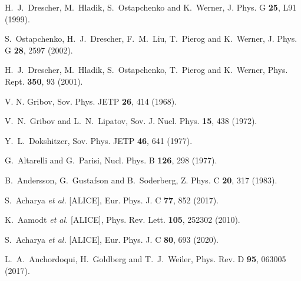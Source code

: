 \documentclass[aps,twocolumn,nofootinbib]{revtex4-1}
\begin{document}
\begin{thebibliography}{}
H.~J.~Drescher, M.~Hladik, S.~Ostapchenko and K.~Werner,
J. Phys. G \textbf{25}, L91 (1999).

S.~Ostapchenko, H.~J.~Drescher, F.~M.~Liu, T.~Pierog and K.~Werner,
J. Phys. G \textbf{28}, 2597 (2002).

H.~J.~Drescher, M.~Hladik, S.~Ostapchenko, T.~Pierog and K.~Werner,
Phys. Rept. \textbf{350}, 93 (2001).

V. N. Gribov, Sov. Phys. JETP \textbf{26}, 414 (1968).

V.~N.~Gribov and L.~N.~Lipatov,
Sov. J. Nucl. Phys. \textbf{15}, 438 (1972).

Y.~L.~Dokshitzer,
Sov. Phys. JETP \textbf{46}, 641 (1977).

G.~Altarelli and G.~Parisi,
Nucl. Phys. B \textbf{126}, 298 (1977).

B.~Andersson, G.~Gustafson and B.~Soderberg,
Z. Phys. C \textbf{20}, 317 (1983).

S.~Acharya \textit{et al.} [ALICE],
Eur. Phys. J. C \textbf{77}, 852 (2017).

K.~Aamodt \textit{et al.} [ALICE],
Phys. Rev. Lett. \textbf{105}, 252302 (2010).

S.~Acharya \textit{et al.} [ALICE],
Eur. Phys. J. C \textbf{80}, 693 (2020).

L.~A.~Anchordoqui, H.~Goldberg and T.~J.~Weiler,
Phys. Rev. D \textbf{95}, 063005 (2017).


\end{thebibliography}
\end{document}
